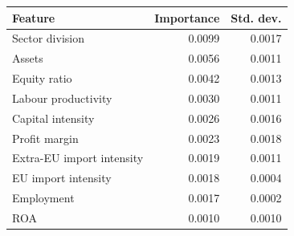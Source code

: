 \begin{table}[!ht]
 \label{tab:permutation_importance_v2}
\centering
\begin{tabular}{lrr}
\hline
Feature & Importance & Std. dev. \\
\hline
Sector division & 0.0099 & 0.0017 \\
Assets & 0.0056 & 0.0011 \\
Equity ratio & 0.0042 & 0.0013 \\
Labour productivity & 0.0030 & 0.0011 \\
Capital intensity & 0.0026 & 0.0016 \\
Profit margin & 0.0023 & 0.0018 \\
Extra-EU import intensity & 0.0019 & 0.0011 \\
EU import intensity & 0.0018 & 0.0004 \\
Employment & 0.0017 & 0.0002 \\
ROA & 0.0010 & 0.0010 \\
\hline
\end{tabular}
\end{table}

